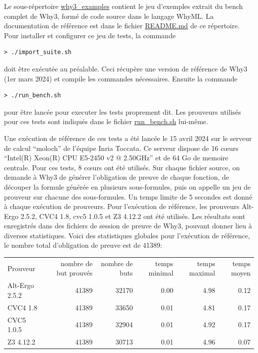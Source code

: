 \documentclass[a4paper,11pt]{article}
\begin{document}
Le sous-répertoire \url{why3_examples} contient le jeu d'exemples
extrait du bench complet de Why3, formé de code source dans le langage
WhyML. La documentation de référence est dans le fichier \url{README.md} de ce répertoire.
Pour installer et configurer ce jeu de tests, la commande
\begin{lstlisting}
> ./import_suite.sh
\end{lstlisting}
doit être exécutée au préalable. Ceci récupère une version de
référence de Why3 (1er mars 2024) et compile les commandes nécessaires. Ensuite la commande
\begin{lstlisting}
> ./run_bench.sh
\end{lstlisting}
pour être lancée pour executer les tests proprement dit. Les prouveurs
utilisés pour ces tests sont indiqués dans le fichier
\url{run_bench.sh} lui-même.

Une exécution de référence de ces tests a été lancée le 15 avril 2024
sur le serveur de calcul ``moloch'' de l'équipe Inria Toccata. Ce
serveur dispose de 16 c{\oe}urs ``Intel(R) Xeon(R) CPU E5-2450 v2 @
2.50GHz'' et de 64 Go de memoire centrale. Pour ces tests, 8 c{\oe}urs
ont été utilisés. Sur chaque fichier source, on demande à Why3 de
générer l'obligation de preuve de chaque fonction, de découper la
formule générée en plusieurs sous-formules, puis on appelle un jeu de
prouveur sur chacune des sous-formules. Un temps limite de 5 secondes est donné à chaque exécution de prouveurs. Pour l'exécution de référence,
les prouveurs Alt-Ergo 2.5.2, CVC4 1.8, cvc5 1.0.5 et Z3 4.12.2 ont
été utilisés. Les résultats sont enregistrés dans des fichiers de
session de preuve de Why3, pouvant donner lieu à diverses
statistiques. Voici des statistiques globales pour l'exécution de
référence, le nombre total d'obligation de preuve est de 41389:
\begin{center}
  \begin{tabular}{|l|r|r|r|r|r|}
  \rowcolor{gray!50} Prouveur
  & \multicolumn{1}{p{0.13\textwidth}|}{nombre de but prouvés }
  & \multicolumn{1}{p{0.13\textwidth}|}{nombre de buts}
  & \multicolumn{1}{p{0.13\textwidth}|}{temps minimal}
  & \multicolumn{1}{p{0.13\textwidth}|}{temps maximal}
  & \multicolumn{1}{p{0.13\textwidth}|}{temps moyen}
  \\
  Alt-Ergo 2.5.2                & 41389 & 32170 &  0.00  & 4.98 &  0.12 \\
  CVC4 1.8                      & 41389 & 33650 &  0.01  & 4.81 &  0.17 \\
  CVC5 1.0.5                    & 41389 & 32904 &  0.01  & 4.92 &  0.17 \\
  Z3 4.12.2                     & 41389 & 30713 &  0.01  & 4.96 &  0.07
\end{tabular}
\end{center}
\end{document}

